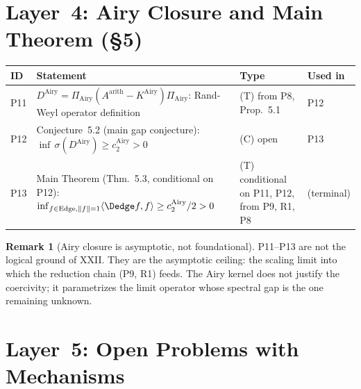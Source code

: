 \documentclass[12pt,a4paper]{amsart}
\theoremstyle{definition}
\newtheorem{remark}[theorem]{Remark}
\begin{document}
\section{Layer~4: Airy Closure and Main Theorem (\S5)}
\label{sec:L4}

\begin{center}
\renewcommand{\arraystretch}{1.35}
\begin{tabular}{l p{5.5cm} l l}
\toprule
\textbf{ID} & \textbf{Statement} & \textbf{Type} & \textbf{Used in} \\
\midrule
P11 & $D^{\mathrm{Airy}} =
     \Pi_{\mathrm{Airy}}(A^{\mathrm{arith}}
     - K^{\mathrm{Airy}})\Pi_{\mathrm{Airy}}$:
     Rand-Weyl operator definition
     & (T) from P8, Prop.~5.1
     & P12 \\
P12 & Conjecture~5.2 (main gap conjecture):
     $\inf\,\sigma(D^{\mathrm{Airy}})
     \ge c_2^{\mathrm{Airy}} > 0$
     & (C) open
    & P13 \\
P13 & Main Theorem (Thm.~5.3,
     conditional on P12):
     $\inf_{f\in\mathrm{Edge},\|f\|=1}
     \langle\Dedge f,f\rangle
     \ge c_2^{\mathrm{Airy}}/2 > 0$
     & (T) conditional on P11, P12,
       from P9, R1, P8
     & (terminal) \\
\bottomrule
\end{tabular}
\end{center}

\begin{remark}[Airy closure is asymptotic, not foundational]
P11--P13 are not the logical ground of XXII.
They are the asymptotic ceiling: the scaling limit into which
the reduction chain (P9, R1) feeds.
The Airy kernel does not justify the coercivity;
it parametrizes the limit operator whose spectral gap
is the one remaining unknown.
\end{remark}

\section{Layer~5: Open Problems with Mechanisms}
\label{sec:L5}
\end{document}
